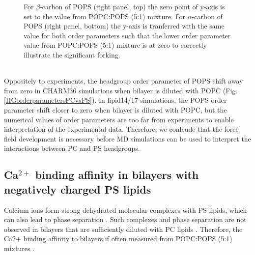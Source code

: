 \documentclass[aps,prl,superscriptaddress,twocolumn]{revtex4}
\begin{document}
\begin{figure}[]
{    For $\beta$-carbon of POPS (right panel, top) the zero point of y-axis is
    set to the value from POPC:POPS (5:1) mixture.
    For $\alpha$-carbon of POPS (right panel, bottom) the y-axis is tranferred
    with the same value for both order parameters such that the lower order
    parameter value from POPC:POPS (5:1) mixture is at zero
    to correctly illustrate the significant forking.
  }
   \\
   \\
\end{figure}

Oppositely to experiments, the headgroup order parameter of POPS shift away
from zero in CHARM36 simulations when bilayer is diluted with POPC (Fig. \ref{HGorderparametersPCvsPS}).
In lipid14/17 simulations, the POPS order parameter shift closer to zero when
bilayer is diluted with POPC, but the numerical values of order parameters
are too far from experiments to enable interpretation of the experimental data.
Therefore, we conlcude that the force field development is necessary before
MD simulations can be used to interpret the interactions between PC and PS headgroups.



\subsection{Ca$^{2+}$ binding affinity in bilayers with negatively charged PS lipids}

Calcium ions form strong dehydrated molecular complexes with PS lipids,
which can also lead to phase separation \cite{hauser77,kurland79,hauser85,feigenson86,mattai89,roux90,roux91}.
Such complexes and phase separation are not observed in
bilayers that are sufficiently diluted with PC
lipids \cite{feigenson86,mattai89,roux90,roux91}.
Therefore, the Ca2+ binding affinity to bilayers if often measured
from POPC:POPS (5:1) mixtures \cite{roux90,roux91}.
\end{document}
